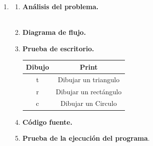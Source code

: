 \begin{enumerate}
\begin{enumerate}[\bfseries a)]
\end{enumerate}

\newpage

\item 
\begin{enumerate}[\bfseries a)]
    
    \item \textbf{Análisis del problema.}\\\\

    \item \textbf{Diagrama de flujo.}\\
	\begin{center}
	\end{center}

    \item \textbf{Prueba de escritorio.}\\
	\begin{center}
	    \begin{tabular}{c|c}
		Dibujo&Print\\
		\hline
		t&Dibujar un triangulo\\
		\hline
		r&Dibujar un rectángulo\\
		\hline
		c&Dibujar un Circulo\\
	    \end{tabular}
	\end{center}
	\vspace{4cm}
    
    \item \textbf{Código fuente.}\\ 
	
	\vspace{3cm}
    
    \item \textbf{Prueba de la ejecución del programa}.\\
	\begin{center}
	\end{center}

\end{enumerate}

\newpage

\end{enumerate}

